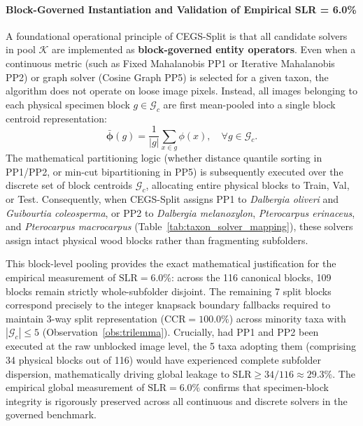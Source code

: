 \documentclass[a4paper,fleqn]{cas-sc}
\begin{document}
\paragraph{Block-Governed Instantiation and Validation of Empirical SLR = 6.0\%}
A foundational operational principle of CEGS-Split is that all candidate solvers in pool $\mathcal{K}$ are implemented as \textbf{block-governed entity operators}. Even when a continuous metric (such as Fixed Mahalanobis PP1 or Iterative Mahalanobis PP2) or graph solver (Cosine Graph PP5) is selected for a given taxon, the algorithm does not operate on loose image pixels. Instead, all images belonging to each physical specimen block $g \in \mathcal{G}_c$ are first mean-pooled into a single block centroid representation:
\begin{equation}
\bar{\boldsymbol{\phi}}(g) = \frac{1}{|g|} \sum_{x \in g} \phi(x), \quad \forall g \in \mathcal{G}_c.
\end{equation}
The mathematical partitioning logic (whether distance quantile sorting in PP1/PP2, or min-cut bipartitioning in PP5) is subsequently executed over the discrete set of block centroids $\mathcal{G}_c$, allocating entire physical blocks to Train, Val, or Test. Consequently, when CEGS-Split assigns PP1 to \textit{Dalbergia oliveri} and \textit{Guibourtia coleosperma}, or PP2 to \textit{Dalbergia melanoxylon}, \textit{Pterocarpus erinaceus}, and \textit{Pterocarpus macrocarpus} (Table~\ref{tab:taxon_solver_mapping}), these solvers assign intact physical wood blocks rather than fragmenting subfolders.

This block-level pooling provides the exact mathematical justification for the empirical measurement of $\mathrm{SLR} = 6.0\%$: across the 116 canonical blocks, 109 blocks remain strictly whole-subfolder disjoint. The remaining 7 split blocks correspond precisely to the integer knapsack boundary fallbacks required to maintain 3-way split representation ($\mathrm{CCR} = 100.0\%$) across minority taxa with $|\mathcal{G}_c| \le 5$ (Observation~\ref{obs:trilemma}). Crucially, had PP1 and PP2 been executed at the raw unblocked image level, the 5 taxa adopting them (comprising 34 physical blocks out of 116) would have experienced complete subfolder dispersion, mathematically driving global leakage to $\mathrm{SLR} \ge 34 / 116 \approx 29.3\%$. The empirical global measurement of $\mathrm{SLR} = 6.0\%$ confirms that specimen-block integrity is rigorously preserved across all continuous and discrete solvers in the governed benchmark.
\end{document}
